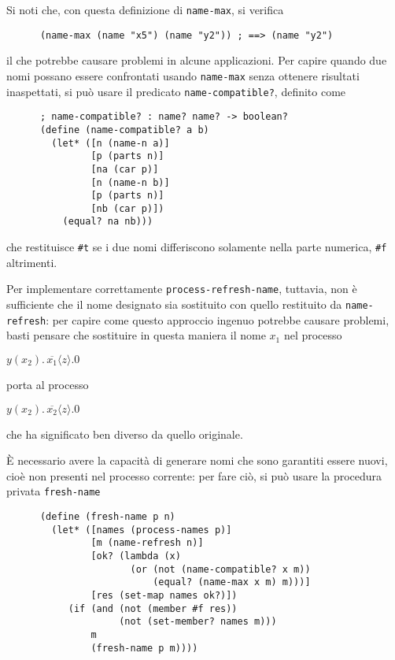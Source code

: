 Si noti che, con questa definizione di \lstinline{name-max}, si verifica

\begin{lstlisting}
      (name-max (name "x5") (name "y2")) ; ==> (name "y2")
\end{lstlisting}

il che potrebbe causare problemi in alcune applicazioni. Per capire quando
due nomi possano essere confrontati usando \lstinline{name-max} senza
ottenere risultati inaspettati, si pu\`o usare il predicato
\lstinline{name-compatible?}, definito come

\begin{lstlisting}
      ; name-compatible? : name? name? -> boolean?
      (define (name-compatible? a b)
        (let* ([n (name-n a)]
               [p (parts n)]
               [na (car p)]
               [n (name-n b)]
               [p (parts n)]
               [nb (car p)])
          (equal? na nb)))
\end{lstlisting}

che restituisce \lstinline{#t} se i due nomi differiscono solamente nella
parte numerica, \lstinline{#f} altrimenti.

Per implementare correttamente \lstinline{process-refresh-name}, tuttavia,
non \`e sufficiente che il nome designato sia sostituito con quello
restituito da \lstinline{name-refresh}: per capire come questo approccio
ingenuo potrebbe causare problemi, basti pensare che sostituire in questa
maniera il nome $x_1$ nel processo

\begin{pilisting}
$
    y(x_2) . \, \overline{x_1}\langle z\rangle . 0
$
\end{pilisting}

porta al processo

\begin{pilisting}
$
    y(x_2) . \, \overline{x_2}\langle z\rangle . 0
$
\end{pilisting}

che ha significato ben diverso da quello originale.

\`E necessario avere la capacit\`a di generare nomi che sono garantiti
essere nuovi, cio\`e non presenti nel processo corrente: per fare ci\`o, si
pu\`o usare la procedura privata \lstinline{fresh-name}

\begin{lstlisting}
      (define (fresh-name p n)
        (let* ([names (process-names p)]
               [m (name-refresh n)]
               [ok? (lambda (x)
                      (or (not (name-compatible? x m))
                          (equal? (name-max x m) m)))]
               [res (set-map names ok?)])
           (if (and (not (member #f res))
                    (not (set-member? names m)))
               m
               (fresh-name p m))))
\end{lstlisting}

